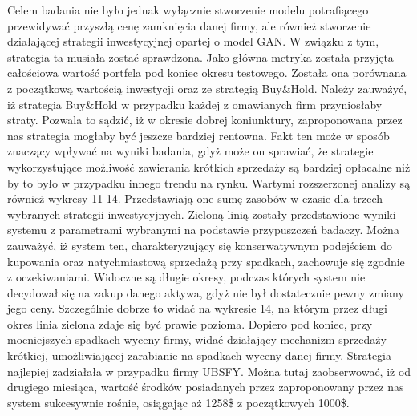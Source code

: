 \documentclass[11pt]{article} %
\begin{document}
Celem badania nie było jednak wyłącznie stworzenie modelu potrafiącego przewidywać przyszłą cenę zamknięcia danej firmy, ale również stworzenie działającej strategii inwestycyjnej opartej o model GAN.  W związku z tym, strategia ta musiała zostać sprawdzona. Jako główna metryka została przyjęta całościowa wartość portfela pod koniec okresu testowego. Została ona porównana z początkową wartością inwestycji oraz ze strategią Buy\&Hold. Należy zauważyć, iż strategia Buy\&Hold w przypadku każdej z omawianych firm przyniosłaby straty. Pozwala to sądzić, iż w okresie dobrej koniunktury, zaproponowana przez nas strategia mogłaby być jeszcze bardziej rentowna. Fakt ten może w sposób znaczący wpływać na wyniki badania, gdyż może on sprawiać, że strategie wykorzystujące możliwość zawierania krótkich sprzedaży są bardziej opłacalne niż by to było w przypadku innego trendu na rynku. 
Wartymi rozszerzonej analizy są również wykresy 11-14. Przedstawiają one sumę zasobów w czasie dla trzech wybranych strategii inwestycyjnych. Zieloną linią zostały przedstawione wyniki systemu z parametrami wybranymi na podstawie przypuszczeń badaczy. Można  zauważyć, iż system ten, charakteryzujący się konserwatywnym podejściem do kupowania oraz natychmiastową sprzedażą przy spadkach, zachowuje się zgodnie z oczekiwaniami. Widoczne są długie okresy, podczas których system nie decydował się na zakup danego aktywa, gdyż nie był dostatecznie pewny zmiany jego ceny. Szczególnie dobrze to widać na wykresie 14, na którym przez długi okres linia zielona zdaje się być prawie pozioma. Dopiero pod koniec, przy mocniejszych spadkach wyceny firmy, widać działający mechanizm sprzedaży krótkiej, umożliwiającej zarabianie na spadkach wyceny danej firmy. Strategia najlepiej zadziałała w przypadku firmy UBSFY. Można tutaj zaobserwować, iż od drugiego miesiąca, wartość środków posiadanych przez zaproponowany przez nas system sukcesywnie rośnie, osiągając aż 1258\$ z początkowych 1000\$.

\pagebreak

\listoffigures
\listoftables
\end{document}
